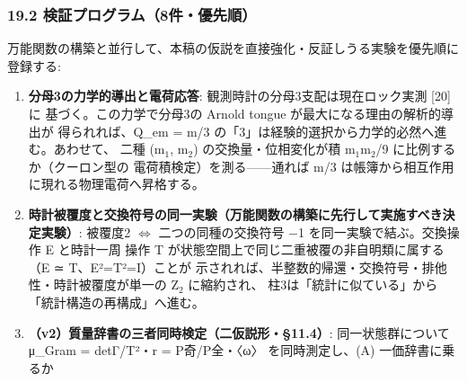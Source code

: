 \documentclass[
]{ltjarticle}
\providecommand{\tightlist}{%
  \setlength{\itemsep}{0pt}\setlength{\parskip}{0pt}}
\begin{document}
\subsubsection{19.2
検証プログラム（8件・優先順）}\label{ux691cux8a3cux30d7ux30edux30b0ux30e9ux30e08ux4ef6ux512aux5148ux9806}

万能関数の構築と並行して、本稿の仮説を直接強化・反証しうる実験を優先順に登録する:

\begin{enumerate}
\def\labelenumi{\arabic{enumi}.}
\tightlist
\item
  \textbf{分母3の力学的導出と電荷応答}:
  観測時計の分母3支配は現在ロック実測 {[}20{]} に
  基づく。この力学で分母3の Arnold tongue が最大になる理由の解析的導出が
  得られれば、Q\_em = m/3
  の「3」は経験的選択から力学的必然へ進む。あわせて、 二種 (m\(_{1}\),
  m\(_{2}\)) の交換量・位相変化が積 m\(_{1}\)m\(_{2}\)/9
  に比例するか（クーロン型の 電荷積検定）を測る------通れば m/3
  は帳簿から相互作用に現れる物理電荷へ昇格する。
\item
  \textbf{時計被覆度と交換符号の同一実験（万能関数の構築に先行して実施すべき決定実験）}:
  被覆度2 \(\Leftrightarrow\) 二つの同種の交換符号 −1
  を同一実験で結ぶ。交換操作 E と時計一周 操作 T
  が状態空間上で同じ二重被覆の非自明類に属する（E ≃ T、E²=T²=I）ことが
  示されれば、半整数的帰還・交換符号・排他性・時計被覆度が単一の
  Z\(_{2}\) に縮約され、
  柱3は「統計に似ている」から「統計構造の再構成」へ進む。
\item
  \textbf{（v2）質量辞書の三者同時検定（二仮説形・§11.4）}:
  同一状態群について μ\_Gram = detΓ/T²・r = P奇/P全・〈ω〉
  を同時測定し、(A) 一価辞書に乗るか


\end{enumerate}
\end{document}
